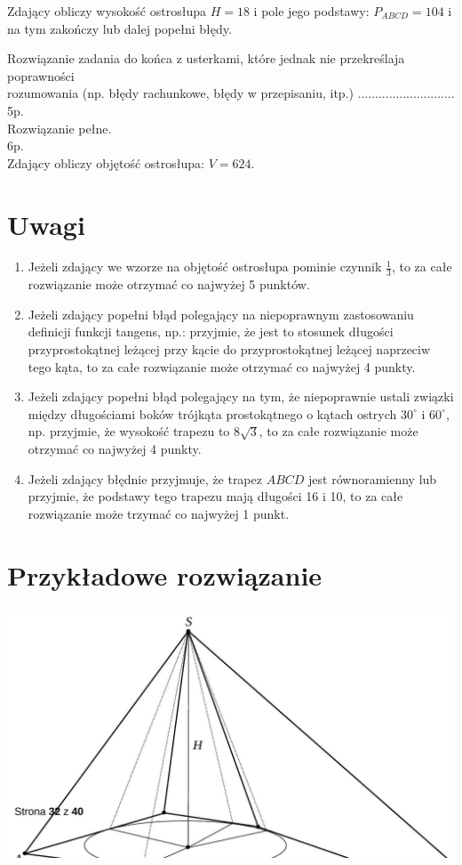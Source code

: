 \documentclass[10pt]{article}
\begin{document}
Zdający obliczy wysokość ostrosłupa $H=18$ i pole jego podstawy: $P_{A B C D}=104$ i na tym zakończy lub dalej popełni błędy.

Rozwiązanie zadania do końca z usterkami, które jednak nie przekreślaja poprawności\\
rozumowania (np. błędy rachunkowe, błędy w przepisaniu, itp.) ............................ 5p.\\
Rozwiązanie pełne.\\
6p.\\
Zdający obliczy objętość ostrosłupa: $V=624$.

\section*{Uwagi}
\begin{enumerate}
  \item Jeżeli zdający we wzorze na objętość ostrosłupa pominie czynnik $\frac{1}{3}$, to za całe rozwiązanie może otrzymać co najwyżej 5 punktów.
  \item Jeżeli zdający popełni błąd polegający na niepoprawnym zastosowaniu definicji funkcji tangens, np.: przyjmie, że jest to stosunek długości przyprostokątnej leżącej przy kącie do przyprostokątnej leżącej naprzeciw tego kąta, to za całe rozwiązanie może otrzymać co najwyżej 4 punkty.
  \item Jeżeli zdający popełni błąd polegający na tym, że niepoprawnie ustali związki między długościami boków trójkąta prostokątnego o kątach ostrych $30^{\circ}$ i $60^{\circ}$, np. przyjmie, że wysokość trapezu to $8 \sqrt{3}$, to za całe rozwiązanie może otrzymać co najwyżej 4 punkty.
  \item Jeżeli zdający błędnie przyjmuje, że trapez $A B C D$ jest równoramienny lub przyjmie, że podstawy tego trapezu mają długości 16 i 10, to za całe rozwiązanie może trzymać co najwyżej 1 punkt.
\end{enumerate}

\section*{Przykładowe rozwiązanie}
\begin{center}
\includegraphics[max width=\textwidth]{2025_02_07_176452ab2cb6278af830g-32}
\end{center}
\end{document}
